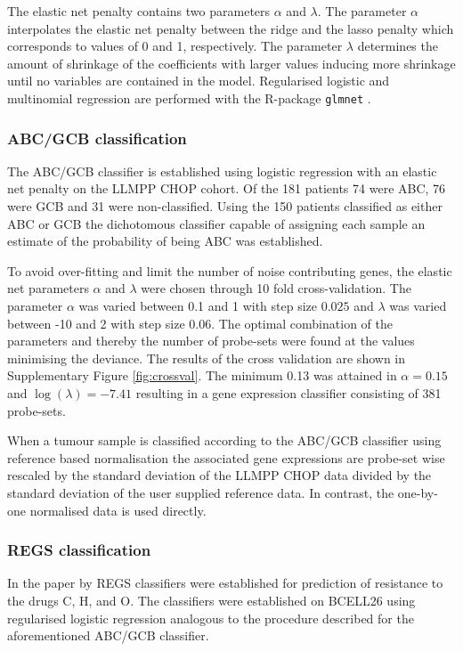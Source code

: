 \documentclass{article}
\begin{document}
The elastic net penalty contains two parameters $\alpha$ and $\lambda$.
The parameter $\alpha$ interpolates the elastic net penalty between the ridge and the lasso penalty which corresponds to values of 0 and 1, respectively.
The parameter $\lambda$ determines the amount of shrinkage of the coefficients with larger values inducing more shrinkage until no variables are contained in the model.
Regularised logistic and multinomial regression are performed with the R-package \texttt{glmnet} \citep{Friedman2010}.

\subsubsection{ABC/GCB classification}
The ABC/GCB classifier is established using logistic regression with an elastic net penalty on the LLMPP CHOP cohort.
Of the 181 patients 74 were ABC, 76 were GCB and 31 were non-classified.
Using the 150 patients classified as either ABC or GCB the dichotomous classifier capable of assigning each sample an estimate of the probability of being ABC was established.

To avoid over-fitting and limit the number of noise contributing genes, the elastic net parameters $\alpha$ and $\lambda$ were chosen through 10 fold cross-validation.
The parameter $\alpha$ was varied between 0.1 and 1 with step size $0.025$ and $\lambda$ was varied between -10 and 2 with step size $0.06$.
The optimal combination of the parameters and thereby the number of probe-sets were found at the values minimising the deviance.
The results of the cross validation are shown in Supplementary Figure \ref{fig:crossval}.
The minimum 0.13 was attained in $\alpha = 0.15$ and $\log(\lambda) = -7.41$ resulting in a gene expression classifier consisting of 381 probe-sets.

When a tumour sample is classified according to the ABC/GCB classifier using reference based normalisation the associated gene expressions are probe-set wise rescaled by the standard deviation of the LLMPP CHOP data divided by the standard deviation of the user supplied reference data.
In contrast, the one-by-one normalised data is used directly.

\subsubsection{REGS classification}
In the paper by \citet{Falgreen2013c} REGS classifiers were established for prediction of resistance to the drugs C, H, and O.
The classifiers were established on BCELL26 using regularised logistic regression analogous to the procedure described for the aforementioned ABC/GCB classifier.
\end{document}
